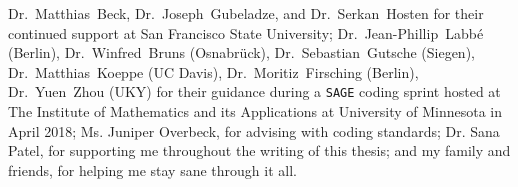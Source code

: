 \documentclass{article}
\begin{document}
 Dr.~Matthias~Beck, Dr.~Joseph~Gubeladze, and Dr.~Serkan~Hosten for their continued support at San Francisco State University;
Dr.~Jean-Phillip~Labb\'e (Berlin), Dr.~Winfred~Bruns (Osnabr\"uck), Dr.~Sebastian~Gutsche (Siegen), Dr.~Matthias~Koeppe (UC Davis), Dr.~Moritiz~Firsching (Berlin), Dr.~Yuen~Zhou (UKY) for their guidance during a \texttt{SAGE} coding sprint hosted at The Institute of Mathematics and its Applications at University of Minnesota in April 2018; Ms. Juniper Overbeck, for advising with coding standards; Dr. Sana Patel, for supporting me throughout the writing of this thesis; and my family and friends, for helping me stay sane through it all.
\end{document}
